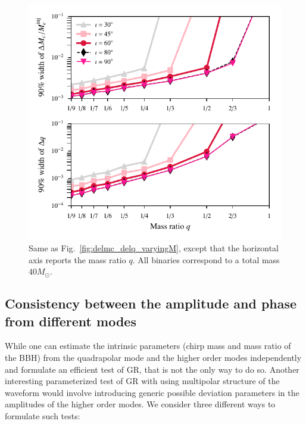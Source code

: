 \documentclass[prd,preprintnumbers,twocolumn,eqsecnum,floatfix,a4paper,nofootinbib,superscriptaddress]{revtex4}
\begin{document}
 \begin{figure}[tbh]
 	\begin{center}
 		\includegraphics[scale=0.8]{figs/hm_9dim_dmcbymcinj_dq_diff_q.pdf}
 	\end{center} 
 	\caption{Same as Fig.~\ref{fig:delmc_delq_varyingM}, except that the horizontal axis reports the mass ratio $q$. All binaries correspond to a total mass $40M_{\odot}$.}
 	\label{fig:delmc_delq_varyingq}
 \end{figure}
\subsection{Consistency between the amplitude and phase from different modes}
\label{sec:simulationsb}

While one can estimate the intrinsic parameters (chirp mass and mass ratio of the BBH) from the quadrapolar mode and the higher order modes independently and formulate an efficient test of GR, that is not the only way to do so. Another interesting parameterized test of GR with using multipolar structure of the waveform would involve introducing generic possible deviation parameters in the amplitudes of the higher order modes. We consider three different  ways to formulate such tests:
\end{document}
